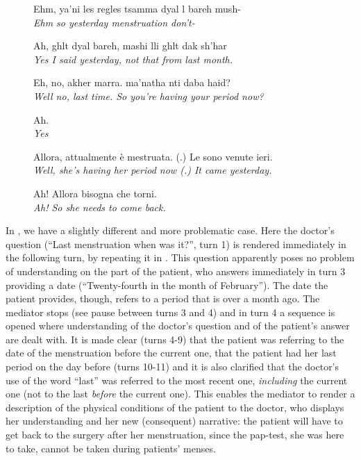 \documentclass[output=paper]{LSP/langsci}
\begin{document}
\begin{figure}
\begin{varwidth}{\textwidth}
\begin{description}[align=left, nosep, style=nextline, leftmargin=3em, format=\normalfont\footnotesize]
	\item [12 \hspace{0.3em} M:] Ehm, ya'ni les regles tsamma dyal l bareh mush- \\ \textit{Ehm so yesterday menstruation don't-}
	\item [13 \hspace{0.3em} P:] Ah, ghlt dyal bareh, mashi lli ghlt dak sh'har \\ \textit{Yes I said yesterday, not that from last month.}
	\item [14 \hspace{0.3em} M:] Eh, no, akher marra. ma'natha nti daba haid? \\ \textit{Well no, last time. So you're having your period now?}
	\item [15 \hspace{0.3em} P:] Ah. \\ \textit{Yes}
	\item [16 \hspace{0.3em} M:] Allora, attualmente è mestruata. (.)  Le sono venute ieri. \\ \textit{Well, she's having her period now (.) It came yesterday.}
	\item [17 \hspace{0.3em} D:] Ah! Allora bisogna che torni. \\ \textit{Ah! So she needs to come back.}
	\end{description}
    \end{varwidth}
\caption{}
\label{baraldi-gavioli:extract:5}
\end{figure}

  In , we have a slightly different and more problematic case. Here the doctor's question (``Last menstruation when was it?'', turn 1) is rendered immediately in the following turn, by repeating it in . This question apparently poses no problem of understanding on the part of the patient, who answers immediately in turn 3 providing a date (``Twenty-fourth in the month of February''). The date the patient provides, though, refers to a period that is over a month ago. The mediator stops (see pause between turns 3 and 4) and in turn 4 a sequence is opened where understanding of the doctor's question and of the patient's answer are dealt with. It is made clear (turns 4-9) that the patient was referring to the date of the menstruation before the current one, that the patient had her last period on the day before (turns 10-11) and it is also clarified that the doctor's use of the word ``last'' was referred  to the most recent one, \textit{including} the current one (not to the last \textit{before} the current one). This enables the mediator to render a description of the physical conditions of the patient to the doctor, who displays her understanding and her new (consequent) narrative: the patient will have to get back to the surgery after her menstruation, since the pap-test, she was here to take, cannot be taken during patients' menses.
\end{document}
